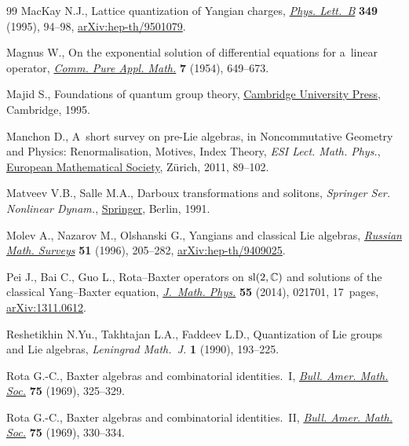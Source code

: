 \begin{thebibliography}{99}
MacKay N.J., Lattice quantization of {Y}angian charges,
 \href{https://doi.org/10.1016/0370-2693(95)00222-7}{\textit{Phys. Lett.~B}}
 \textbf{349} (1995), 94--98,
 \href{http://arxiv.org/abs/hep-th/9501079}{arXiv:hep-th/9501079}.

Magnus W., On the exponential solution of differential equations for a~linear
 operator, \href{https://doi.org/10.1002/cpa.3160070404}{\textit{Comm. Pure
 Appl. Math.}} \textbf{7} (1954), 649--673.

Majid S., Foundations of quantum group theory,
 \href{https://doi.org/10.1017/CBO9780511613104}{Cambridge University Press},
 Cambridge, 1995.

Manchon D., A~short survey on pre-{L}ie algebras, in Noncommutative Geometry
 and Physics: Renormalisation, Motives, Index Theory, \textit{ESI Lect. Math. Phys.},
 \href{https://doi.org/10.4171/008-1/3}{European Mathematical Society},
 Z\"urich, 2011, 89--102.

Matveev V.B., Salle M.A., Darboux transformations and solitons, \textit{Springer Ser. Nonlinear Dynam.}, \href{https://doi.org/10.1007/978-3-662-00922-2}{Springer},
 Berlin, 1991.

Molev A., Nazarov M., Olshanski G., Yangians and classical {L}ie algebras,
 \href{https://doi.org/10.1070/RM1996v051n02ABEH002772}{\textit{Russian Math.
 Surveys}} \textbf{51} (1996), 205--282,
 \href{http://arxiv.org/abs/hep-th/9409025}{arXiv:hep-th/9409025}.

Pei J., Bai C., Guo L., Rota--{B}axter operators on {${\rm sl}(2,{\mathbb C})$}
 and solutions of the classical {Y}ang--{B}axter equation,
 \href{https://doi.org/10.1063/1.4863898}{\textit{J.~Math. Phys.}} \textbf{55}
 (2014), 021701, 17~pages,
 \href{http://arxiv.org/abs/1311.0612}{arXiv:1311.0612}.

Reshetikhin N.Yu., Takhtajan L.A., Faddeev L.D., Quantization of {L}ie groups
 and {L}ie algebras, \textit{Leningrad Math.~J.} \textbf{1} (1990), 193--225.

Rota G.-C., Baxter algebras and combinatorial identities.~{I},
 \href{https://doi.org/10.1090/S0002-9904-1969-12156-7}{\textit{Bull. Amer.
 Math. Soc.}} \textbf{75} (1969), 325--329.

Rota G.-C., Baxter algebras and combinatorial identities.~{II},
 \href{https://doi.org/10.1090/S0002-9904-1969-12158-0}{\textit{Bull. Amer.
 Math. Soc.}} \textbf{75} (1969), 330--334.


\end{thebibliography}
